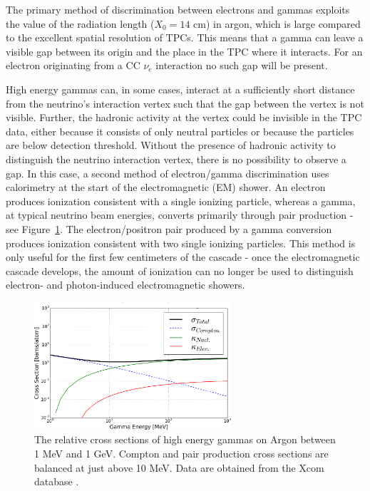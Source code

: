 The primary method of discrimination between electrons and gammas exploits the value of the radiation length ($X_0 = 14$ cm) in argon, which is large compared to the excellent spatial resolution of TPCs. This means that a gamma can leave a visible gap between its origin and the place in the TPC where it interacts.  For an electron originating from a CC $\nu_e$ interaction no such gap will be present.

High energy gammas can, in some cases, interact at a sufficiently short distance from the neutrino's interaction vertex such that the gap between the vertex is not visible.  Further, the hadronic activity at the vertex could be invisible in the TPC data, either because it consists of only neutral particles or because the particles are below detection threshold.  Without the presence of hadronic activity to distinguish the neutrino interaction vertex, there is no possibility to observe a gap.  In this case, a second method of electron/gamma discrimination uses calorimetry at the start of the electromagnetic (EM) shower.  An electron produces ionization consistent with a single ionizing particle, whereas a gamma, at typical neutrino beam energies, converts primarily through pair production - see Figure~\ref{fig:gamma_xsec}.  The electron/positron pair produced by a gamma conversion produces ionization consistent with two single ionizing particles.  This method is only useful for the first few centimeters of the cascade - once the electromagnetic cascade develops, the amount of ionization can no longer be used to distinguish electron- and photon-induced electromagnetic showers.


\begin{figure}[ht!]
  \centering
  \includegraphics[width=0.65\textwidth]{emshower_figures/photonCrossSection_trimmed.png}
  \caption[Photon Cross Section on Argon]{\label{fig:gamma_xsec} The relative cross sections of high energy gammas on Argon between 1 MeV and 1 GeV. Compton and pair production cross sections are balanced at just above 10 MeV.  Data are obtained from the Xcom database \cite{Xcom}.}
\end{figure}

